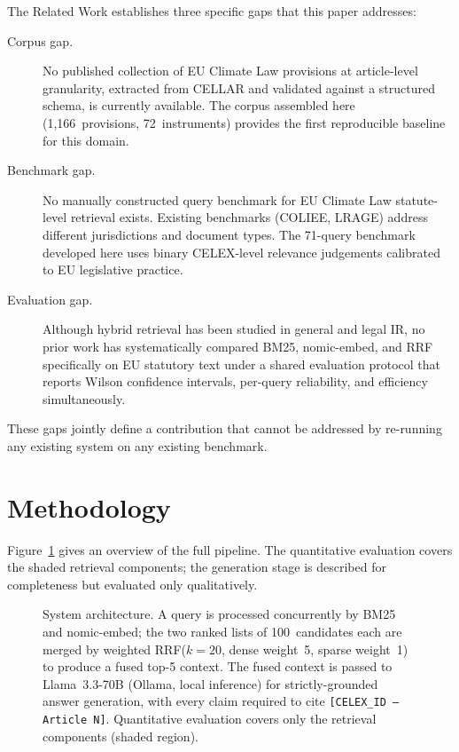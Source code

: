 \documentclass[sigconf,screen]{acmart}
\newcommand{\nomicshort}{nomic-embed\xspace}
\newcommand{\rrf}{RRF\xspace}
\begin{document}
The Related Work establishes three specific gaps that this paper
addresses:

\begin{description}
  \item[Corpus gap.] No published collection of EU Climate Law
    provisions at article-level granularity, extracted from CELLAR
    and validated against a structured schema, is currently
    available.  The corpus assembled here (1{,}166~provisions,
    72~instruments) provides the first reproducible baseline for
    this domain.

  \item[Benchmark gap.] No manually constructed query benchmark for
    EU Climate Law statute-level retrieval exists.  Existing
    benchmarks (COLIEE, LRAGE) address different jurisdictions and
    document types.  The 71-query benchmark developed here uses
    binary CELEX-level relevance judgements calibrated to EU
    legislative practice.

  \item[Evaluation gap.] Although hybrid retrieval has been studied
    in general and legal IR, no prior work has systematically
    compared BM25, \nomicshort, and \rrf specifically on EU statutory
    text under a shared evaluation protocol that reports Wilson
    confidence intervals, per-query reliability, and efficiency
    simultaneously.
\end{description}

These gaps jointly define a contribution that cannot be addressed by
re-running any existing system on any existing benchmark.

\section{Methodology}
\label{sec:method}

Figure~\ref{fig:architecture} gives an overview of the full pipeline.
The quantitative evaluation covers the shaded retrieval components;
the generation stage is described for completeness but evaluated only
qualitatively.

\begin{figure}[ht]
  \centering
  \fbox{\rule{0pt}{4.5cm}\rule{0.88\linewidth}{0pt}}
  \caption{System architecture.  A query is processed concurrently
    by BM25 and \nomicshort; the two ranked lists of 100~candidates
    each are merged by weighted \rrf ($k{=}20$, dense weight~5,
    sparse weight~1) to produce a fused top-5 context.  The fused
    context is passed to Llama~3.3-70B (Ollama, local inference) for
    strictly-grounded answer generation, with every claim required to
    cite \texttt{[CELEX\_ID\,---\,Article\,N]}.  Quantitative
    evaluation covers only the retrieval components (shaded region).}
  \label{fig:architecture}
\end{figure}
\end{document}
